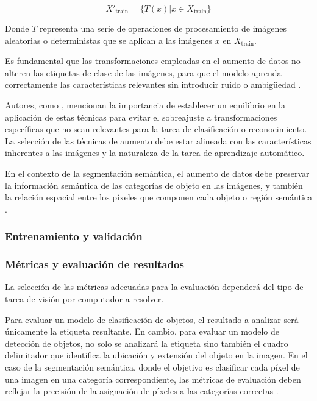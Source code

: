 \begin{equation}
    X'_{\text{train}} = \{ T(x) | x \in X_{\text{train}} \}
\end{equation}

Donde \( T \) representa una serie de operaciones de procesamiento de imágenes aleatorias o deterministas que se aplican a las imágenes \( x \) en \( X_{\text{train}} \).

Es fundamental que las transformaciones empleadas en el aumento de datos no alteren las etiquetas de clase de las imágenes, para que el modelo aprenda correctamente las características relevantes sin introducir ruido o ambigüedad \cite{aghdam2017guide}.

Autores, como , mencionan la importancia de establecer un equilibrio en la aplicación de estas técnicas para evitar el sobreajuste a transformaciones específicas que no sean relevantes para la tarea de clasificación o reconocimiento. La selección de las técnicas de aumento debe estar alineada con las características inherentes a las imágenes y la naturaleza de la tarea de aprendizaje automático.

En el contexto de la segmentación semántica, el aumento de datos debe preservar la información semántica de las categorías de objeto en las imágenes, y también la relación espacial entre los píxeles que componen cada objeto o región semántica \cite{aghdam2017guide}.

\subsubsection{Entrenamiento y validación}



\subsubsection{Métricas y evaluación de resultados}

La selección de las métricas adecuadas para la evaluación dependerá del tipo de tarea de visión por computador a resolver.

Para evaluar un modelo de clasificación de objetos, el resultado a analizar será únicamente la etiqueta resultante. En cambio, para evaluar un modelo de detección de objetos, no solo se analizará la etiqueta sino también el cuadro delimitador que identifica la ubicación y extensión del objeto en la imagen. En el caso de la segmentación semántica, donde el objetivo es clasificar cada píxel de una imagen en una categoría correspondiente, las métricas de evaluación deben reflejar la precisión de la asignación de píxeles a las categorías correctas \cite{patterson2017deep}.

